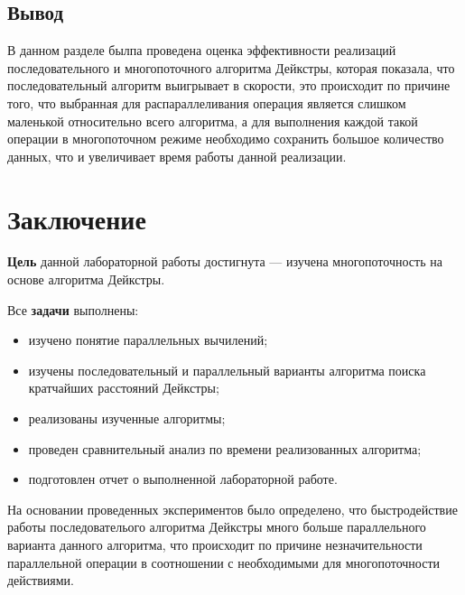 \documentclass[a4paper,14pt, unknownkeysallowed]{extreport}
\begin{document}
\section*{Вывод}
	
В данном разделе былпа проведена оценка эффективности реализаций последовательного и многопоточного алгоритма Дейкстры, которая показала, что последовательный алгоритм выигрывает в скорости, это происходит по причине того, что выбранная для распараллеливания операция является слишком маленькой относительно всего алгоритма, а для выполнения каждой такой операции в многопоточном режиме необходимо сохранить большое количество данных, что и увеличивает время работы данной реализации.
	
\chapter*{Заключение}


\textbf{Цель} данной лабораторной работы достигнута --- изучена многопоточность на основе алгоритма Дейкстры. 

Все \textbf{задачи} выполнены:

\begin{itemize}
	\item изучено понятие параллельных вычилений;
	\item изучены последовательный и параллельный варианты алгоритма поиска кратчайших расстояний Дейкстры;
	\item реализованы изученные алгоритмы;
	\item проведен сравнительный анализ по времени реализованных алгоритма;
	\item подготовлен отчет о выполненной лабораторной работе.
\end{itemize}
	
На основании проведенных экспериментов было определено, что быстродействие работы последователього алгоритма Дейкстры много больше параллельного варианта данного алгоритма, что происходит по причине незначительности параллельной операции в соотношении с необходимыми для многопоточности действиями.
	

\nocite{*} 

\renewcommand\bibname{Список использованных источников} %
	
\end{document}
